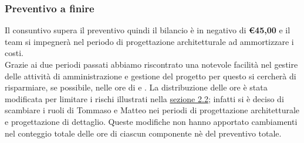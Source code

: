 \subsubsection{Preventivo a finire}
Il consuntivo supera il preventivo quindi il bilancio è in negativo di \textbf{\euro45,00} e il team si impegnerà nel periodo di progettazione architetturale ad ammortizzare i costi.\\
Grazie ai due periodi passati abbiamo riscontrato una notevole facilità nel gestire delle attività di amministrazione e gestione del progetto per questo si cercherà di risparmiare, se possibile, nelle ore di \AM{} e \RES{}.
La distribuzione delle ore è stata modificata per limitare i rischi illustrati nella \hyperref[sez2.2]{sezione 2.2}; infatti si è deciso di scambiare i ruoli di Tommaso e Matteo nei periodi di progettazione architetturale e progettazione di dettaglio. Queste modifiche non hanno apportato cambiamenti nel conteggio totale delle ore di ciascun componente nè del preventivo totale.
